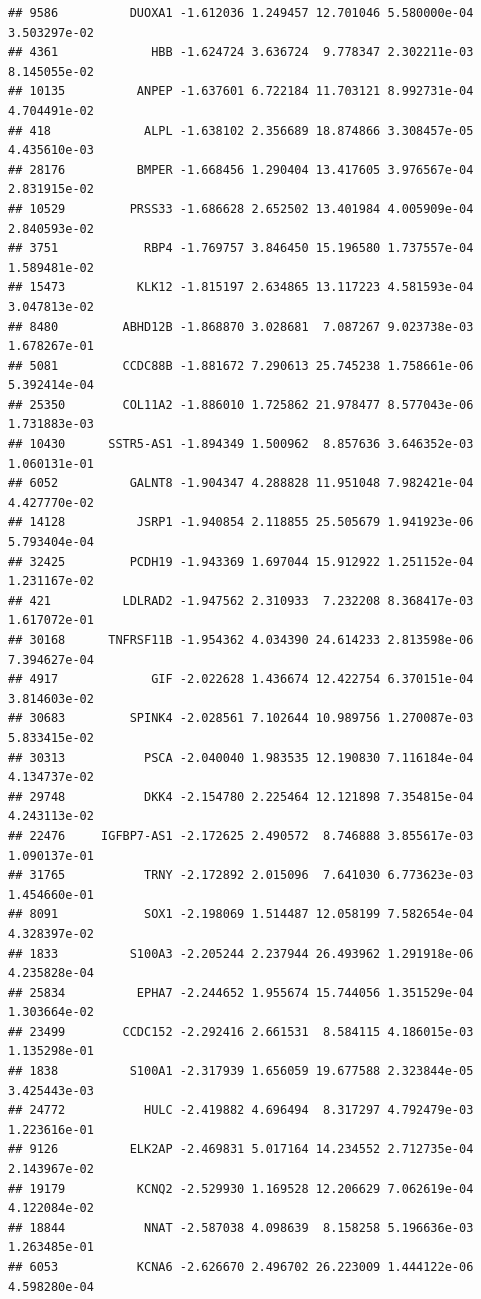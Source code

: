 \documentclass[
]{article}
\begin{document}
\begin{verbatim}
## 9586          DUOXA1 -1.612036 1.249457 12.701046 5.580000e-04 3.503297e-02
## 4361             HBB -1.624724 3.636724  9.778347 2.302211e-03 8.145055e-02
## 10135          ANPEP -1.637601 6.722184 11.703121 8.992731e-04 4.704491e-02
## 418             ALPL -1.638102 2.356689 18.874866 3.308457e-05 4.435610e-03
## 28176          BMPER -1.668456 1.290404 13.417605 3.976567e-04 2.831915e-02
## 10529         PRSS33 -1.686628 2.652502 13.401984 4.005909e-04 2.840593e-02
## 3751            RBP4 -1.769757 3.846450 15.196580 1.737557e-04 1.589481e-02
## 15473          KLK12 -1.815197 2.634865 13.117223 4.581593e-04 3.047813e-02
## 8480         ABHD12B -1.868870 3.028681  7.087267 9.023738e-03 1.678267e-01
## 5081         CCDC88B -1.881672 7.290613 25.745238 1.758661e-06 5.392414e-04
## 25350        COL11A2 -1.886010 1.725862 21.978477 8.577043e-06 1.731883e-03
## 10430      SSTR5-AS1 -1.894349 1.500962  8.857636 3.646352e-03 1.060131e-01
## 6052          GALNT8 -1.904347 4.288828 11.951048 7.982421e-04 4.427770e-02
## 14128          JSRP1 -1.940854 2.118855 25.505679 1.941923e-06 5.793404e-04
## 32425         PCDH19 -1.943369 1.697044 15.912922 1.251152e-04 1.231167e-02
## 421          LDLRAD2 -1.947562 2.310933  7.232208 8.368417e-03 1.617072e-01
## 30168      TNFRSF11B -1.954362 4.034390 24.614233 2.813598e-06 7.394627e-04
## 4917             GIF -2.022628 1.436674 12.422754 6.370151e-04 3.814603e-02
## 30683         SPINK4 -2.028561 7.102644 10.989756 1.270087e-03 5.833415e-02
## 30313           PSCA -2.040040 1.983535 12.190830 7.116184e-04 4.134737e-02
## 29748           DKK4 -2.154780 2.225464 12.121898 7.354815e-04 4.243113e-02
## 22476     IGFBP7-AS1 -2.172625 2.490572  8.746888 3.855617e-03 1.090137e-01
## 31765           TRNY -2.172892 2.015096  7.641030 6.773623e-03 1.454660e-01
## 8091            SOX1 -2.198069 1.514487 12.058199 7.582654e-04 4.328397e-02
## 1833          S100A3 -2.205244 2.237944 26.493962 1.291918e-06 4.235828e-04
## 25834          EPHA7 -2.244652 1.955674 15.744056 1.351529e-04 1.303664e-02
## 23499        CCDC152 -2.292416 2.661531  8.584115 4.186015e-03 1.135298e-01
## 1838          S100A1 -2.317939 1.656059 19.677588 2.323844e-05 3.425443e-03
## 24772           HULC -2.419882 4.696494  8.317297 4.792479e-03 1.223616e-01
## 9126          ELK2AP -2.469831 5.017164 14.234552 2.712735e-04 2.143967e-02
## 19179          KCNQ2 -2.529930 1.169528 12.206629 7.062619e-04 4.122084e-02
## 18844           NNAT -2.587038 4.098639  8.158258 5.196636e-03 1.263485e-01
## 6053           KCNA6 -2.626670 2.496702 26.223009 1.444122e-06 4.598280e-04

\end{verbatim}
\end{document}
